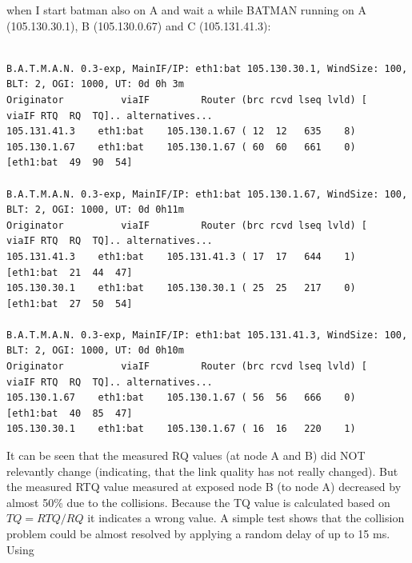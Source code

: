 \documentclass[11pt]{article}
\begin{document}
when I start batman also on A and wait a while
BATMAN running on A (105.130.30.1), B (105.130.0.67)  and C (105.131.41.3):

\begin{small}
\begin{verbatim}
 
B.A.T.M.A.N. 0.3-exp, MainIF/IP: eth1:bat 105.130.30.1, WindSize: 100, BLT: 2, OGI: 1000, UT: 0d 0h 3m
Originator          viaIF         Router (brc rcvd lseq lvld) [   viaIF RTQ  RQ  TQ].. alternatives...
105.131.41.3    eth1:bat    105.130.1.67 ( 12  12   635    8)
105.130.1.67    eth1:bat    105.130.1.67 ( 60  60   661    0) [eth1:bat  49  90  54]

B.A.T.M.A.N. 0.3-exp, MainIF/IP: eth1:bat 105.130.1.67, WindSize: 100, BLT: 2, OGI: 1000, UT: 0d 0h11m
Originator          viaIF         Router (brc rcvd lseq lvld) [   viaIF RTQ  RQ  TQ].. alternatives...
105.131.41.3    eth1:bat    105.131.41.3 ( 17  17   644    1) [eth1:bat  21  44  47]
105.130.30.1    eth1:bat    105.130.30.1 ( 25  25   217    0) [eth1:bat  27  50  54]

B.A.T.M.A.N. 0.3-exp, MainIF/IP: eth1:bat 105.131.41.3, WindSize: 100, BLT: 2, OGI: 1000, UT: 0d 0h10m
Originator          viaIF         Router (brc rcvd lseq lvld) [   viaIF RTQ  RQ  TQ].. alternatives...
105.130.1.67    eth1:bat    105.130.1.67 ( 56  56   666    0) [eth1:bat  40  85  47]
105.130.30.1    eth1:bat    105.130.1.67 ( 16  16   220    1)

\end{verbatim}
\end{small}

It can be seen that the measured RQ values (at node A and B) did NOT relevantly change (indicating, that the link quality has not really changed). But the measured RTQ value measured at exposed node B (to node A) decreased by almost 50\% due to the collisions. 
Because the TQ value is calculated based on $TQ = RTQ / RQ$ it indicates
a wrong value.
%
A simple test shows that the collision problem could be almost resolved by applying a random delay of up to 15 ms. Using
\end{document}
